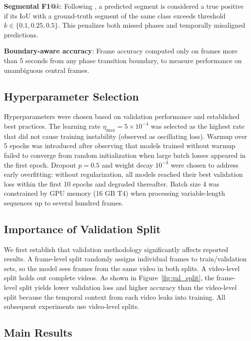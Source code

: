 \documentclass[10pt,twocolumn]{article}
\begin{document}
\textbf{Segmental F1@$k$}: Following \cite{farha2019mstcn}, a predicted segment is considered a true positive if its IoU with a ground-truth segment of the same class exceeds threshold $k \in \{0.1, 0.25, 0.5\}$. This penalizes both missed phases and temporally misaligned predictions.

\textbf{Boundary-aware accuracy}: Frame accuracy computed only on frames more than 5 seconds from any phase transition boundary, to measure performance on unambiguous central frames.

\subsection{Hyperparameter Selection}

Hyperparameters were chosen based on validation performance and established best practices. The learning rate $\eta_\text{max} = 5 \times 10^{-4}$ was selected as the highest rate that did not cause training instability (observed as oscillating loss). Warmup over 5 epochs was introduced after observing that models trained without warmup failed to converge from random initialization when large batch losses appeared in the first epoch. Dropout $p = 0.5$ and weight decay $10^{-3}$ were chosen to address early overfitting: without regularization, all models reached their best validation loss within the first 10 epochs and degraded thereafter. Batch size 4 was constrained by GPU memory (16 GB T4) when processing variable-length sequences up to several hundred frames.

\subsection{Importance of Validation Split}

We first establish that validation methodology significantly affects reported results. A frame-level split randomly assigns individual frames to train/validation sets, so the model sees frames from the same video in both splits. A video-level split holds out complete videos. As shown in Figure~\ref{fig:val_split}, the frame-level split yields lower validation loss and higher accuracy than the video-level split because the temporal context from each video leaks into training. All subsequent experiments use video-level splits.

\subsection{Main Results}
\end{document}
